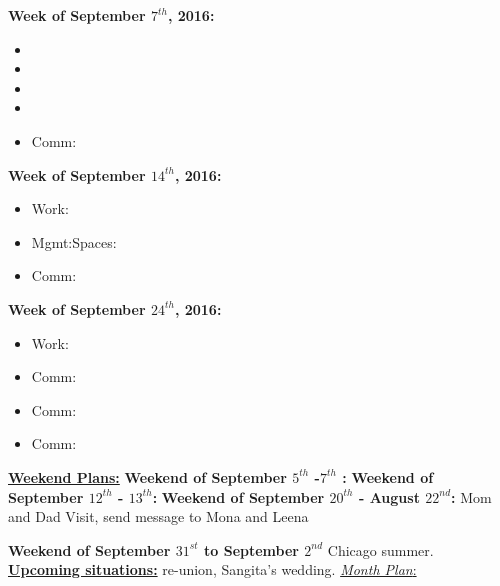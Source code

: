\documentclass[serif, mathserif, final]{beamer}
\begin{document}
\begin{frame}
\begin{columns}
\begin{block}
\textbf{Week of September $7^{th}$, 2016:} \\
\begin{itemize} 
\tiny \item \tiny
\item \tiny 
\item \tiny 
\item \tiny 
\item \tiny Comm:
\end{itemize} 

\textbf{Week of September $14^{th}$, 2016:} \\ 
\begin{itemize} 
\tiny \item \tiny Work: 
\item \tiny Mgmt:Spaces: 
\item \tiny Comm: 
\end{itemize}

\textbf{Week of September $24^{th}$, 2016:} \\
\begin{itemize}
\tiny \item \tiny Work: 
\item \tiny Comm: 
\item \tiny Comm: 
\item \tiny Comm: 
\end{itemize}

\underline{\textbf{Weekend Plans:}}
\textbf{Weekend of September $5^{th}$ -$7^{th}$ : } 
\textbf{Weekend of September $12^{th}$ - $13^{th}$:}
\textbf{Weekend of September $20^{th}$ - August $22^{nd}$:} Mom  and
Dad Visit, send message to Mona and Leena 

\textbf{Weekend of September $31^{st}$  to September $2^{nd}$ }
Chicago summer. \\

\underline{\textbf{Upcoming situations:}} re-union, Sangita's
wedding. 
\underline{\textit{Month Plan}:} \\

\end{block}

\end{columns}
\end{frame}
\end{document}
